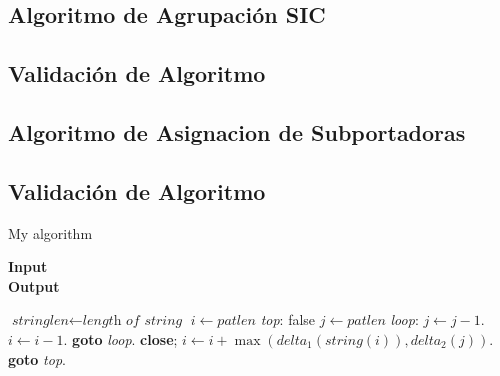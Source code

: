 \subsection{Algoritmo de Agrupación SIC}

\subsection{Validación de Algoritmo}

\subsection{Algoritmo de Asignacion de Subportadoras}

\subsection{Validación de Algoritmo}

\makeatletter
\def\algbackskip{\hskip-\ALG@thistlm}
\makeatother

\begin{algorithm}
    \caption{My algorithm}\label{euclid}
    \hspace*{\algorithmicindent} \textbf{Input} \\
    \hspace*{\algorithmicindent} \textbf{Output} 
    \begin{algorithmic}[1]
    \State $\textit{stringlen} \gets \textit{length of } \textit{string}$
    \State $i \gets \textit{patlen}$
    \BState \emph{top}:
     \Return false
    \EndIf
    \State $j \gets \textit{patlen}$
    \BState \emph{loop}:
    \State $j \gets j-1$.
    \State $i \gets i-1$.
    \State \textbf{goto} \emph{loop}.
    \State \textbf{close};
    \EndIf
    \State $i \gets i+\max(\textit{delta}_1(\textit{string}(i)),\textit{delta}_2(j))$.
    \State \textbf{goto} \emph{top}.
    \EndProcedure
    \end{algorithmic}
\end{algorithm}


